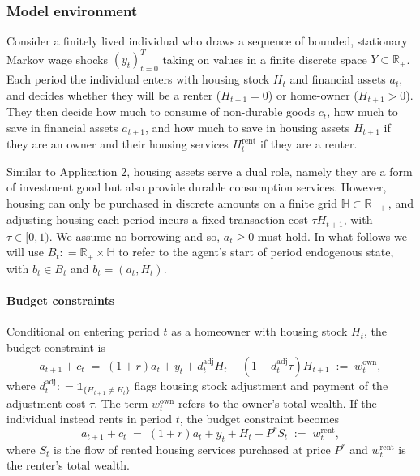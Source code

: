 \documentclass[12pt]{article}
\begin{document}

\subsubsection{Model environment}

Consider a finitely lived  individual who draws a sequence of bounded, stationary Markov wage shocks $(y_{t})_{t=0}^{T}$ taking on values in a finite discrete space $Y\subset \mathbb{R}_{+}$. Each period the individual enters with housing stock $H_{t}$ and financial assets $a_{t}$, and decides whether they will be a renter ($H_{t+1}=0$) or home-owner ($H_{t+1}>0$). They then decide how much to consume of non-durable goods $c_{t}$, how much to save in financial assets $a_{t+1}$, and how much to save in housing assets $H_{t+1}$ if they are an owner and their housing services $H^{\text{rent}}_{t}$ if they are a renter. 

Similar to Application 2, housing assets serve a dual role, namely they are a form of investment good but also provide durable consumption services. However, housing can only be purchased in discrete amounts on a finite grid $\mathbb{H}\subset \mathbb{R}_{++}$, and adjusting housing each period incurs a fixed transaction cost $\tau H_{t+1}$, with $\tau \in [0,1)$. We assume no borrowing and so, $a_{t}\geq 0$ must hold. In what follows we will use $B_{t}\colon = \mathbb{R}_{+}\times \mathbb{H}$ to refer to the agent's start of period endogenous state, with $b_{t}\in B_{t}$ and $b_{t} = (a_{t}, H_{t})$. 

\paragraph{Budget constraints} Conditional on entering period $t$ as a homeowner with housing stock $H_t$, the budget constraint is
\begin{equation}\label{eq:budget_owner}
a_{t+1}+c_{t} \;=\; (1+r)a_{t}+y_{t}
                  + d^{\text{adj}}_{t}H_{t}
                  -(1+d^{\text{adj}}_{t}\tau)H_{t+1}
        \;:=\; w_{t}^{\text{own}},
\end{equation}
where $d^{\text{adj}}_{t}\colon = \mathbb{1}_{\{H_{t+1}\neq H_{t}\}}$ flags housing stock adjustment and payment of the adjustment cost $\tau$. The term $ w_{t}^{\text{own}}$ refers to the owner's total wealth. If the individual instead rents in period $t$, the budget constraint becomes
%
\begin{equation}\label{eq:budget_renter}
a_{t+1}+c_{t} \;=\; (1+r)a_{t}+y_{t}
                  + H_{t}
                  - P^{r}S_{t}
        \;:=\; w_{t}^{\text{rent}},
\end{equation}
%
where $S_{t}$ is the flow of rented housing services purchased at price $P^{r}$ and $ w_{t}^{\text{rent}}$ is the renter's total wealth.
\end{document}
